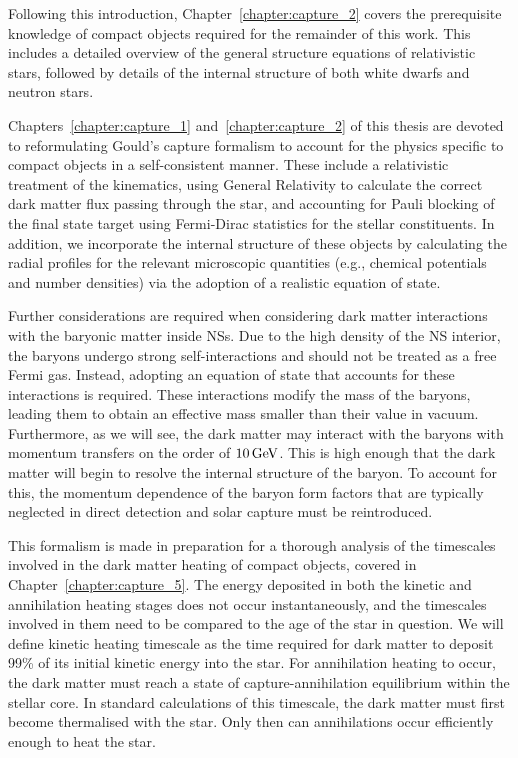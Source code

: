 Following this introduction, Chapter~\ref{chapter:capture_2} covers the prerequisite knowledge of compact objects
required for the remainder of this work. This includes a detailed overview of the general structure equations of relativistic stars, followed by details of the internal structure of both white dwarfs and neutron stars. 

Chapters~\ref{chapter:capture_1} and~\ref{chapter:capture_2} of this thesis are devoted to reformulating Gould's capture formalism to account for the physics specific to compact objects in a self-consistent manner. These include a relativistic treatment of the kinematics, using General Relativity to calculate the correct dark matter flux passing through the star, and accounting for Pauli blocking of the final state target using Fermi-Dirac statistics for the stellar constituents. In addition, we incorporate the internal structure of these objects by calculating the radial profiles for the relevant microscopic quantities (e.g., chemical potentials and number densities) via the adoption of a realistic equation of state.

Further considerations are required when considering dark matter interactions with the baryonic matter inside NSs. Due to the high density of the NS interior, the baryons undergo strong self-interactions and should not be treated as a free Fermi gas. Instead, adopting an equation of state that accounts for these interactions is required. These interactions modify the mass of the baryons, leading them to obtain an effective mass smaller than their value in vacuum. Furthermore, as we will see, the dark matter may interact with the baryons with momentum transfers on the order of $10{\rm \,GeV}$. This is high enough that the dark matter will begin to resolve the internal structure of the baryon. To account for this, the momentum dependence of the baryon form factors that are typically neglected in direct detection and solar capture must be reintroduced.

This formalism is made in preparation for a thorough analysis of the timescales involved in the dark matter heating of compact objects, covered in Chapter~\ref{chapter:capture_5}. The energy deposited in both the kinetic and annihilation heating stages does not occur instantaneously, and the timescales involved in them need to be compared to the age of the star in question. We will define kinetic heating timescale as the time required for dark matter to deposit 99\% of its initial kinetic energy into the star. For annihilation heating to occur, the dark matter must reach a state of capture-annihilation equilibrium within the stellar core. In standard calculations of this timescale, the dark matter must first become thermalised with the star. Only then can annihilations occur efficiently enough to heat the star. 


